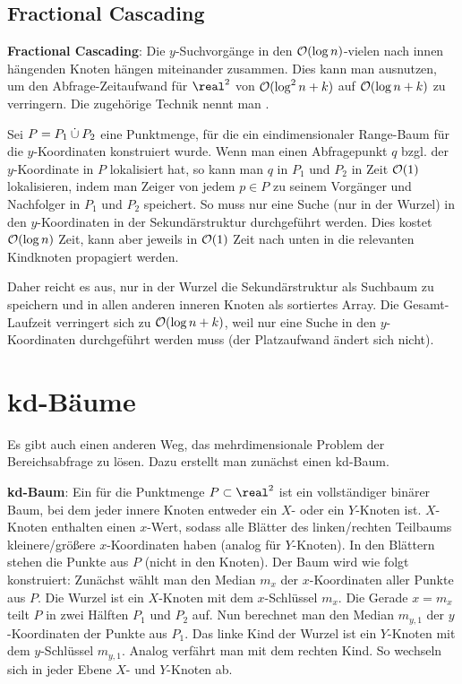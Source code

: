 \subsection{%
    Fractional Cascading%
}

\textbf{Fractional Cascading}:
Die $y$-Suchvorgänge in den $\mathcal{O}(\log n)$-vielen nach innen hängenden Knoten hängen miteinander
zusammen.
Dies kann man ausnutzen, um den Abfrage-Zeitaufwand für $\real^2$
von $\mathcal{O}(\log^2 n + k)$ auf $\mathcal{O}(\log n + k)$ zu verringern.
Die zugehörige Technik nennt man .

Sei $P = P_1 \mathbin{\dot{\cup}} P_2$ eine Punktmenge, für die ein eindimensionaler Range-Baum für
die $y$-Koordinaten konstruiert wurde.
Wenn man einen Abfragepunkt $q$ bzgl. der $y$-Koordinate in $P$ lokalisiert hat,
so kann man $q$ in $P_1$ und $P_2$ in Zeit $\mathcal{O}(1)$ lokalisieren,
indem man Zeiger von jedem $p \in P$ zu seinem Vorgänger und Nachfolger in $P_1$ und $P_2$
speichert.
So muss nur eine Suche (nur in der Wurzel) in den $y$-Koordinaten in der Sekundärstruktur
durchgeführt werden.
Dies kostet $\mathcal{O}(\log n)$ Zeit, kann aber jeweils in $\mathcal{O}(1)$ Zeit nach unten in die relevanten
Kindknoten propagiert werden.

Daher reicht es aus, nur in der Wurzel die Sekundärstruktur als Suchbaum zu speichern und
in allen anderen inneren Knoten als sortiertes Array.
Die Gesamt-Laufzeit verringert sich zu $\mathcal{O}(\log n + k)$, weil nur eine Suche in den $y$-Koordinaten
durchgeführt werden muss
(der Platzaufwand ändert sich nicht).

\pagebreak

\section{%
    kd-Bäume%
}

Es gibt auch einen anderen Weg, das mehrdimensionale Problem der Bereichsabfrage zu lösen.
Dazu erstellt man zunächst einen kd-Baum.

\textbf{kd-Baum}:
Ein  für die Punktmenge $P \subset \real^2$ ist ein vollständiger binärer Baum,
bei dem jeder innere Knoten entweder ein $X$- oder ein $Y$-Knoten ist.
$X$-Knoten enthalten einen $x$-Wert, sodass alle Blätter des linken/rechten Teilbaums
kleinere/größere $x$-Koordinaten haben (analog für $Y$-Knoten).
In den Blättern stehen die Punkte aus $P$ (nicht in den Knoten).
Der Baum wird wie folgt konstruiert:
Zunächst wählt man den Median $m_x$ der $x$-Koordinaten aller Punkte aus $P$.
Die Wurzel ist ein $X$-Knoten mit dem $x$-Schlüssel $m_x$.
Die Gerade $x = m_x$ teilt $P$ in zwei Hälften $P_1$ und $P_2$ auf.
Nun berechnet man den Median $m_{y,1}$ der $y$-Koordinaten der Punkte aus $P_1$.
Das linke Kind der Wurzel ist ein $Y$-Knoten mit dem $y$-Schlüssel $m_{y,1}$.
Analog verfährt man mit dem rechten Kind.
So wechseln sich in jeder Ebene $X$- und $Y$-Knoten ab.

